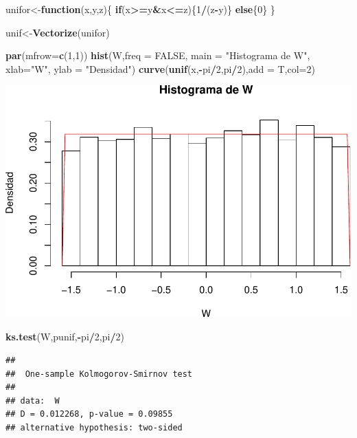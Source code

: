 \documentclass[]{article}
\newenvironment{Shaded}{\begin{snugshade}}{\end{snugshade}}
\newcommand{\KeywordTok}[1]{\textcolor[rgb]{0.13,0.29,0.53}{\textbf{#1}}}
\newcommand{\DataTypeTok}[1]{\textcolor[rgb]{0.13,0.29,0.53}{#1}}
\newcommand{\DecValTok}[1]{\textcolor[rgb]{0.00,0.00,0.81}{#1}}
\newcommand{\StringTok}[1]{\textcolor[rgb]{0.31,0.60,0.02}{#1}}
\newcommand{\OtherTok}[1]{\textcolor[rgb]{0.56,0.35,0.01}{#1}}
\newcommand{\ControlFlowTok}[1]{\textcolor[rgb]{0.13,0.29,0.53}{\textbf{#1}}}
\newcommand{\OperatorTok}[1]{\textcolor[rgb]{0.81,0.36,0.00}{\textbf{#1}}}
\newcommand{\NormalTok}[1]{#1}
\begin{document}
\begin{Shaded}
\begin{Highlighting}[]
\NormalTok{unifor<-}\ControlFlowTok{function}\NormalTok{(x,y,z)\{}
  \ControlFlowTok{if}\NormalTok{(x}\OperatorTok{>=}\NormalTok{y}\OperatorTok{&}\NormalTok{x}\OperatorTok{<=}\NormalTok{z)\{}\DecValTok{1}\OperatorTok{/}\NormalTok{(z}\OperatorTok{-}\NormalTok{y)\}}
  \ControlFlowTok{else}\NormalTok{\{}\DecValTok{0}\NormalTok{\}}
\NormalTok{\}}

\NormalTok{unif<-}\KeywordTok{Vectorize}\NormalTok{(unifor)}

\KeywordTok{par}\NormalTok{(}\DataTypeTok{mfrow=}\KeywordTok{c}\NormalTok{(}\DecValTok{1}\NormalTok{,}\DecValTok{1}\NormalTok{))}
\KeywordTok{hist}\NormalTok{(W,}\DataTypeTok{freq =} \OtherTok{FALSE}\NormalTok{, }\DataTypeTok{main =} \StringTok{"Histograma de W"}\NormalTok{, }\DataTypeTok{xlab=}\StringTok{"W"}\NormalTok{, }\DataTypeTok{ylab =} \StringTok{"Densidad"}\NormalTok{)}
\KeywordTok{curve}\NormalTok{(}\KeywordTok{unif}\NormalTok{(x,}\OperatorTok{-}\NormalTok{pi}\OperatorTok{/}\DecValTok{2}\NormalTok{,pi}\OperatorTok{/}\DecValTok{2}\NormalTok{),}\DataTypeTok{add =}\NormalTok{ T,}\DataTypeTok{col=}\DecValTok{2}\NormalTok{)}
\end{Highlighting}
\end{Shaded}

\includegraphics[width=0.7\linewidth]{notebook_simulaciones_files/figure-latex/unnamed-chunk-9-1}

\begin{Shaded}
\begin{Highlighting}[]
\KeywordTok{ks.test}\NormalTok{(W,punif,}\OperatorTok{-}\NormalTok{pi}\OperatorTok{/}\DecValTok{2}\NormalTok{,pi}\OperatorTok{/}\DecValTok{2}\NormalTok{)}
\end{Highlighting}
\end{Shaded}

\begin{verbatim}
## 
##  One-sample Kolmogorov-Smirnov test
## 
## data:  W
## D = 0.012268, p-value = 0.09855
## alternative hypothesis: two-sided
\end{verbatim}
\end{document}
